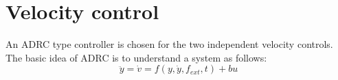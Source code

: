 \documentclass[a4paper, 11pt]{article}
\begin{document}
\newpage
\section{Velocity control}
An ADRC type controller is chosen for the two independent velocity controls. The basic idea of ADRC is to understand a system as follows:
\begin{equation}
	\ddot{y} = \dot{v} = f(y,\dot{y}, f_{ext}, t) + bu
\end{equation}


\newpage
%
\end{document}
